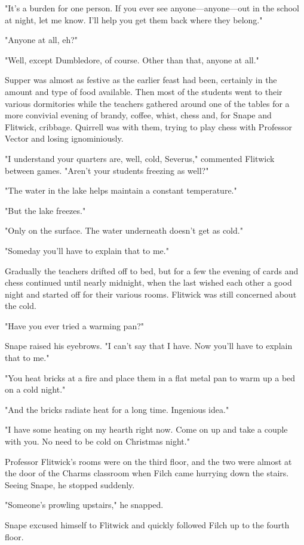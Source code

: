 "It's a burden for one person. If you ever see anyone—anyone—out in the school at night, let me know. I'll help you get them back where they belong."

"Anyone at all, eh?"

"Well, except Dumbledore, of course. Other than that, anyone at all."

Supper was almost as festive as the earlier feast had been, certainly in the amount and type of food available. Then most of the students went to their various dormitories while the teachers gathered around one of the tables for a more convivial evening of brandy, coffee, whist, chess and, for Snape and Flitwick, cribbage. Quirrell was with them, trying to play chess with Professor Vector and losing ignominiously.

"I understand your quarters are, well, cold, Severus," commented Flitwick between games. "Aren't your students freezing as well?"

"The water in the lake helps maintain a constant temperature."

"But the lake freezes."

"Only on the surface. The water underneath doesn't get as cold."

"Someday you'll have to explain that to me."

Gradually the teachers drifted off to bed, but for a few the evening of cards and chess continued until nearly midnight, when the last wished each other a good night and started off for their various rooms. Flitwick was still concerned about the cold.

"Have you ever tried a warming pan?"

Snape raised his eyebrows. "I can't say that I have. Now you'll have to explain that to me."

"You heat bricks at a fire and place them in a flat metal pan to warm up a bed on a cold night."

"And the bricks radiate heat for a long time. Ingenious idea."

"I have some heating on my hearth right now. Come on up and take a couple with you. No need to be cold on Christmas night."

Professor Flitwick's rooms were on the third floor, and the two were almost at the door of the Charms classroom when Filch came hurrying down the stairs. Seeing Snape, he stopped suddenly.

"Someone's prowling upstairs," he snapped.

Snape excused himself to Flitwick and quickly followed Filch up to the fourth floor.


